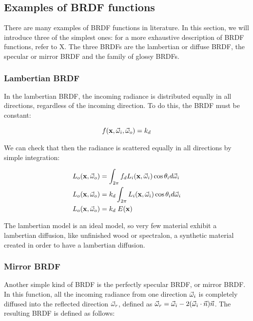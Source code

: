 \subsection{Examples of BRDF functions}

There are many examples of BRDF functions in literature. In this section, we will introduce three of the simplest ones: for a more exhaustive description of BRDF functions, refer to X. The three BRDFs are the lambertian or diffuse BRDF, the specular or mirror BRDF and the family of glossy BRDFs.

\subsubsection{Lambertian BRDF}

In the lambertian BRDF, the incoming radiance is distributed equally in all directions, regardless of the incoming direction. To do this, the BRDF must be constant:

$$
f(\mathbf{x}, \vec{\omega}_i, \vec{\omega}_o) = k_d
$$

We can check that then the radiance is scattered equally in all directions by simple integration:

\begin{equation*}
\begin{split}
L_o(\mathbf{x}, \vec{\omega}_o) &= \int_{2\pi} f_d L_i(\mathbf{x}, \vec{\omega}_i) \cos\theta_i d\vec{\omega}_i \\
L_o(\mathbf{x}, \vec{\omega}_o) &= k_d \int_{2\pi} L_i(\mathbf{x}, \vec{\omega}_i) \cos\theta_i d\vec{\omega}_i \\
L_o(\mathbf{x}, \vec{\omega}_o) &= k_d \; E(\mathbf{x}) \\
\end{split}
\end{equation*}

The lambertian model is an ideal model, so very few material exhibit a lambertian diffusion, like unfinished wood or spectralon, a synthetic material created in order to have a lambertian diffusion. 

\subsubsection{Mirror BRDF}

Another simple kind of BRDF is the perfectly specular BRDF, or mirror BRDF. In this function, all the incoming radiance from one direction $\vec{\omega}_i$ is completely diffused into the reflected direction $\vec{\omega}_r$, defined as $\vec{\omega}_r = \vec{\omega}_i - 2 (\vec{\omega}_i \cdot \vec{n}) \vec{n}$. The resulting BRDF is defined as follows:

